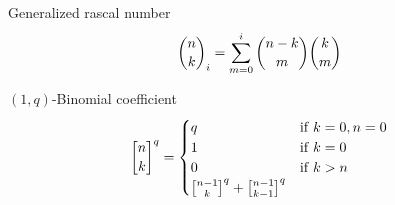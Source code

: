 ﻿\begin{definition}
    Generalized rascal number
    \begin{align}
        \binom{n}{k}_{i} = \sum_{m=0}^{i} \binom{n-k}{m} \binom{k}{m}
    \end{align}
\end{definition}

\begin{definition}
    $(1,q)$-Binomial coefficient
    \begin{equation}
        \oneQBinomial{n}{k}{q} =
        \begin{cases}
            q & \mathrm{if} \; k=0, n=0 \\
            1 & \mathrm{if} \; k=0 \\
            0 & \mathrm{if} \; k > n \\
            \oneQBinomial{n-1}{k}{q} + \oneQBinomial{n-1}{k-1}{q}
        \end{cases}\label{eq:qbinomial-definition}
    \end{equation}
\end{definition}

